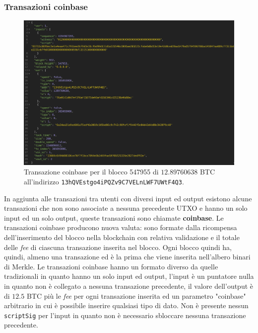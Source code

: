 \subsubsection{Transazioni coinbase}
\begin{figure}[H]
    \centering
    \includegraphics[width=\textwidth]{images/coinbasetx.png}
    \caption{Transazione coinbase per il blocco 547955 di $12.89760638$ BTC all'indirizzo \texttt{13hQVEstgo4iPQZv9C7VELnLWF7UWtF4Q3}.}
\end{figure}
In aggiunta alle transazioni tra utenti con diversi input ed output esistono alcune transazioni che non sono associate a nessuna precedente UTXO e hanno un solo input ed un solo output, queste transazioni sono chiamate \textbf{coinbase}.\newline
Le transazioni coinbase producono nuova valuta: sono formate dalla ricompensa dell'inserimento del blocco nella blockchain con relativa validazione e il totale delle \textit{fee} di ciascuna transazione inserita nel blocco. Ogni blocco quindi ha, quindi, almeno una transazione ed è la prima che viene inserita nell'albero binari di Merkle.\newline
Le transazioni coinbase hanno un formato diverso da quelle tradizionali in quanto hanno un solo input ed output, l'input è un puntatore nulla in quanto non è collegato a nessuna transazione precedente, il valore dell'output è di $12.5$ BTC più le \textit{fee} per ogni transazione inserita ed un parametro "coinbase" arbitrario in cui è possibile inserire qualsiasi tipo di dato. Non è presente nessun \texttt{scriptSig} per l'input in quanto non è necessario sbloccare nessuna transazione precedente.\newline
